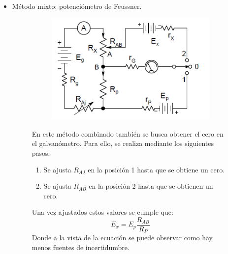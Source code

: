 \begin{itemize}
	\item Método mixto: potenciómetro de Feussner.
	\begin{figure}[H]
		\begin{minipage}{0.5\textwidth}
			\begin{figure}[H]
				\centering
				\includegraphics[width=0.7\linewidth]{ImagenesTema4/11}
				\label{fig:9}
			\end{figure}\textbf{}	
		\end{minipage}
		\begin{minipage}{0.5\textwidth}
			En este método combinado también se busca obtener el cero en el galvanómetro. Para ello, se realiza mediante los siguientes pasos:
			\begin{enumerate}
				\item Se ajusta $R_{AJ}$ en la posición 1 hasta que se obtiene un cero.
				\item Se ajusta $R_{AB}$ en la posición 2 hasta que se obtienen un cero.
			\end{enumerate}
			Una vez ajustados estos valores se cumple que:
			\[E_x=E_p\frac{R_{AB}}{R_P}\]
			Donde a la vista de la ecuación se puede observar como hay menos fuentes de incertidumbre.
		\end{minipage}
	\end{figure}
\end{itemize}
